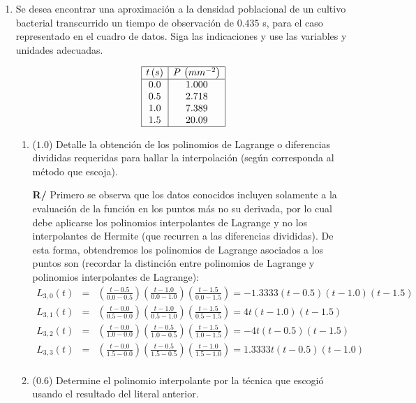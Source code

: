 \documentclass[12pt]{article}
\begin{document}
\vspace{-.5cm}
  \begin{enumerate}[leftmargin=*,widest=9]
  
    \item {\small Se desea encontrar una aproximación a la densidad poblacional de un cultivo bacterial transcurrido un tiempo de observación de \(0.435\) s, para el caso representado en el cuadro de datos. Siga las indicaciones y use las variables y unidades adecuadas.

\vspace*{-.7cm}
\[
\begin{array}{|c|c|}
\hline
t\, (s) & P\, \left(mm^{-2}\right) \\
\hline
0.0 & 1.000 \\
0.5 & 2.718 \\
1.0 & 7.389 \\
1.5 & 20.09 \\
\hline
\end{array}
\]
\vspace{-.9cm}    
    
    }
    
   \begin{enumerate}[label=\alph*]
    \item (\(1.0\)) Detalle la obtención de los polinomios de Lagrange o diferencias divididas requeridas para hallar la interpolación (según corresponda al método que escoja).
    
    \textbf{R/} Primero se observa que los datos conocidos incluyen solamente a la evaluación de la función en los puntos más no su derivada, por lo cual debe aplicarse los polinomios interpolantes de Lagrange y no los interpolantes de Hermite (que recurren a las diferencias divididas).
    De esta forma, obtendremos los polinomios de Lagrange asociados a los puntos son (recordar la distinción entre polinomios de Lagrange y polinomios interpolantes de Lagrange):
    \begin{eqnarray*}
    L_{3,0}(t) & = & \left(\frac{t-0.5}{0.0-0.5} \right) \left(\frac{t-1.0}{0.0-1.0} \right) \left(\frac{t-1.5}{0.0-1.5} \right) =  -1.3333(t-0.5)(t-1.0)(t-1.5) \\
    L_{3,1}(t) & = & \left(\frac{t-0.0}{0.5-0.0} \right) \left(\frac{t-1.0}{0.5-1.0} \right) \left(\frac{t-1.5}{0.5-1.5} \right) = 4t(t-1.0)(t-1.5) \\
    L_{3,2}(t) & = & \left(\frac{t-0.0}{1.0-0.0} \right) \left(\frac{t-0.5}{1.0-0.5} \right) \left(\frac{t-1.5}{1.0-1.5} \right) = -4t(t-0.5)(t-1.5) \\
    L_{3,3}(t) & = & \left(\frac{t-0.0}{1.5-0.0} \right) \left(\frac{t-0.5}{1.5-0.5} \right) \left(\frac{t-1.0}{1.5-1.0} \right) = 1.3333t(t-0.5)(t-1.0) \\
    \end{eqnarray*}
    \item (\(0.6\)) Determine el polinomio interpolante por la técnica que escogió usando el resultado del literal anterior.
    

\end{enumerate}
\end{enumerate}
\end{document}
